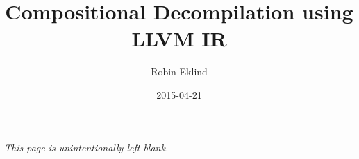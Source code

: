 \documentclass[12pt, a4paper]{article}
\title{Compositional Decompilation using LLVM IR}
\author{Robin Eklind}
\date{2015-04-21}
\begin{document}



%


\maketitle



\clearpage





\tableofcontents

\clearpage



\thispagestyle{empty}

\vspace*{2.5cm}

\begin{center}
	\textit{This page is unintentionally left blank.}
\end{center}

\clearpage




















\end{document}
